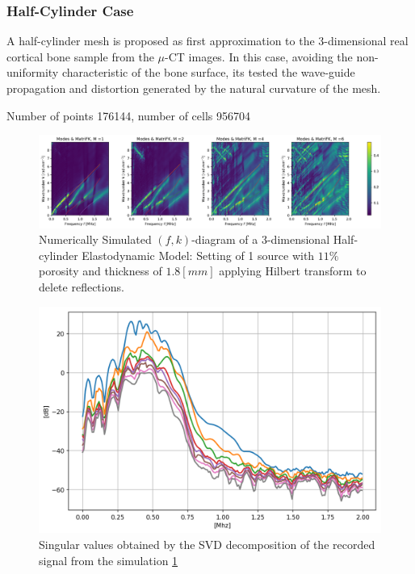 \subsubsection{Half-Cylinder Case}
A half-cylinder mesh is proposed as first approximation to the 3-dimensional real cortical bone sample from the $\mu$-CT images. In this case, avoiding the non-uniformity characteristic of the bone surface, its tested the wave-guide propagation and distortion generated by the natural curvature of the mesh.

Number of points 176144, number of cells 956704

\begin{figure}[!h]
	\centering
	\includegraphics[width=\textwidth]{images/ClusterSim/3DCylTimeP11TransIsoFKW18.png}
	\caption{Numerically Simulated $(f,k)$-diagram of a 3-dimensional Half-cylinder Elastodynamic Model: Setting of 1 source with $11\%$ porosity and thickness of $1.8 [mm]$ applying Hilbert transform to delete reflections.}
	\label{FK-Cyl-DiagramS1P11M18}
\end{figure} 

\begin{figure}[!h]  
	\centering
	\includegraphics[scale=.5]{images/ClusterSim/3DCylTimeP11TransIsoFKW18_SV.png}
	\caption{Singular values obtained by the SVD decomposition of the recorded signal from the simulation \ref{FK-Cyl-DiagramS1P11M18}}
	\label{SVD-Cyl-S1P11M18}
\end{figure}


